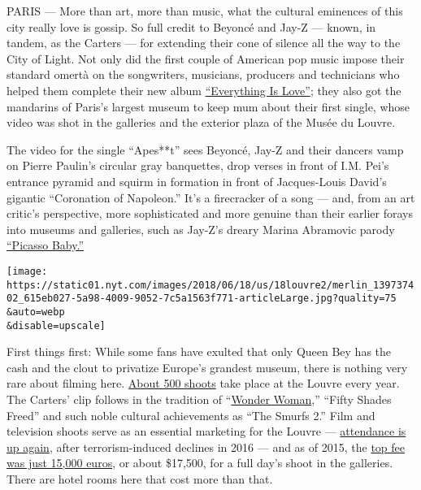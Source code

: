 PARIS --- More than art, more than music, what the cultural eminences of
this city really love is gossip. So full credit to Beyoncé and Jay-Z ---
known, in tandem, as the Carters --- for extending their cone of silence
all the way to the City of Light. Not only did the first couple of
American pop music impose their standard omertà on the songwriters,
musicians, producers and technicians who helped them complete their new
album
\href{https://www.nytimes.com/2018/06/16/arts/music/beyonce-jay-z-surprise-album-everything-is-love.html}{``Everything
Is Love''}; they also got the mandarins of Paris's largest museum to
keep mum about their first single, whose video was shot in the galleries
and the exterior plaza of the Musée du Louvre.

The video for the single ``Apes**t'' sees Beyoncé, Jay-Z and their
dancers vamp on Pierre Paulin's circular gray banquettes, drop verses in
front of I.M. Pei's entrance pyramid and squirm in formation in front of
Jacques-Louis David's gigantic ``Coronation of Napoleon.'' It's a
firecracker of a song --- and, from an art critic's perspective, more
sophisticated and more genuine than their earlier forays into museums
and galleries, such as Jay-Z's dreary Marina Abramovic parody
\href{https://www.google.com/search?rlz=1C1GCEA_enUS797US797\&ei=0XomW_7mKNDb5gKwnKb4Dw\&q=picasso+baby+youtube\&oq=\%E2\%80\%9CPicasso+Baby\%E2\%80\%9D+you+tube\&gs_l=psy-ab.1.0.0i13k1j0i8i13i30k1.6288.7591.0.9302.9.9.0.0.0.0.122.640.2j4.6.0....0...1.1.64.psy-ab..3.6.638...0j0i22i30k1j0i22i10i30k1.0.oigzrMvEW6A}{``Picasso
Baby.''}

\texttt{[image: https://static01.nyt.com/images/2018/06/18/us/18louvre2/merlin\_139737402\_615eb027-5a98-4009-9052-7c5a1563f771-articleLarge.jpg?quality=75\\\&auto=webp\\\&disable=upscale]}

First things first: While some fans have exulted that only Queen Bey has
the cash and the clout to privatize Europe's grandest museum, there is
nothing very rare about filming here.
\href{https://twitter.com/MuseeLouvre/status/920265761448480768}{About
500 shoots} take place at the Louvre every year. The Carters' clip
follows in the tradition of
``\href{https://geeks.media/wonder-woman-as-an-art-historian}{Wonder
Woman},'' ``Fifty Shades Freed'' and such noble cultural achievements as
``The Smurfs 2.'' Film and television shoots serve as an essential
marketing for the Louvre ---
\href{http://presse.louvre.fr/8-1-million-visitors-to-the-louvre-in-2017/}{attendance
is up again}, after terrorism-induced declines in 2016 --- and as of
2015, the
\href{https://www.louvre.fr/sites/default/files/medias/medias_fichiers/fichiers/pdf/louvre-tarifs-sur-le-domaine-du-louvre-et-des-tuileries-2015.pdf}{top
fee was just 15,000 euros}, or about \$17,500, for a full day's shoot in
the galleries. There are hotel rooms here that cost more than that.

